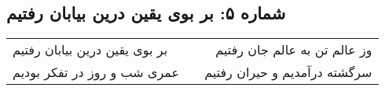 \begin{center}
\section*{شماره ۵: بر بوی یقین درین بیابان رفتیم}
\label{sec:005}
\begin{longtable}{l p{0.5cm} r}
بر بوی یقین درین بیابان رفتیم
&&
وز عالم تن به عالم جان رفتیم
\\
عمری شب و روز در تفکر بودیم
&&
سرگشته درآمدیم و حیران رفتیم
\\
\end{longtable}
\end{center}
